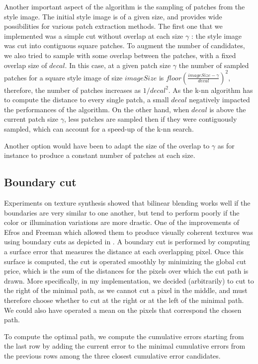 \documentclass[a4paper]{article}
\begin{document}
Another important aspect of the algorithm is the sampling of patches from the style image. The initial style image is of a given size, and provides wide possibilities for various patch extraction methods. 
The first one that we implemented was a simple cut without overlap at each size $\gamma$ : the style image was cut into contiguous square patches. 
To augment the number of candidates, we also tried to sample with some overlap between the patches, with a fixed overlap size of $decal$. In this case, at a given patch size $\gamma$ the number of sampled patches for a square style image of size $imageSize$ is $floor(\frac{imageSize-\gamma}{decal})^2$, therefore, the number of patches increases as $1/decal^2$. As the k-nn algorithm has to compute the distance to every single patch, a small $decal$ negatively impacted the performances of the algorithm. On the other hand, when $decal$ is above the current patch size $\gamma$, less patches are sampled then if they were contiguously sampled, which can account for a speed-up of the k-nn search.

Another option would have been to adapt the size of the overlap to $\gamma$ as for instance to produce a constant number of patches at each size.


\subsection{Boundary cut}

Experiments on texture synthesis showed that bilinear blending works well if the boundaries are very similar to one another, but tend to perform poorly if the color or illumination variations are more drastic. One of the improvements of Efros and Freeman which allowed them to produce visually coherent textures was using boundary cuts as depicted in \cite{quilting}. A boundary cut is performed by computing a surface error that measures the distance at each overlapping pixel. Once this surface is computed, the cut is operated smoothly by minimizing the global cut price, which is the sum of the distances for the pixels over which the cut path is drawn. More specifically, in my implementation, we decided (arbitrarily) to cut to the right of the minimal path, as we cannot cut a pixel in the middle, and must therefore choose whether to cut at the right or at the left of the minimal path. We could also have operated a mean on the pixels that correspond the chosen path.

To compute the optimal path, we compute the cumulative errors starting from the last row by adding the current error to the minimal cumulative errors from the previous rows among the three closest cumulative error candidates.
\end{document}
